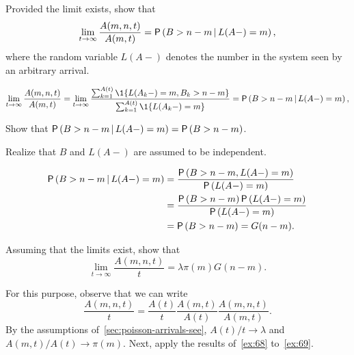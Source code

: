 \documentclass[companion]{subfiles}
\begin{document}
\begin{extra}
Provided the limit exists, show that
\begin{equation}\label{eq:1332}
\lim_{t\to\infty} \frac{A(m,n,t)}{A(m,t)} =\P{B>n-m\given L(A-)=m},
\end{equation}
where the random variable $L(A-)$ denotes the number in the system seen by an arbitrary arrival.
\begin{solution}
\begin{equation*}
\lim_{t\to\infty} \frac{A(m,n,t)}{A(m,t)} = 
\lim_{t\to\infty} \frac{\sum_{k=1}^{A(t)}\1{L(A_k-) = m, B_k > n-m}}
{\sum_{k=1}^{A(t)}\1{L(A_k-) = m}}=\P{B>n-m\given L(A-)=m},
\end{equation*}
\end{solution}
\end{extra}


\begin{extra}
Show that $\P{B>n-m\given L(A-)=m}=\P{B>n-m}$.
\begin{hint}
 Realize that $B$ and $L(A-)$ are assumed to be independent.
\end{hint}
\begin{solution}
\begin{equation*}
 \begin{split}
\P{B>n-m\given L(A-)=m} &=
\frac{\P{B>n-m,L(A-)=m}}{\P{L(A-)=m}}\\
&=\frac{\P{B>n-m}\P{L(A-)=m}}{\P{L(A-)=m}} \\
&= \P{B>n-m} =G(n-m).
 \end{split}
\end{equation*}
\end{solution}
\end{extra}

\begin{exercise}
Assuming that the limits exist, show that
\begin{equation*}
\lim_{t\to\infty} \frac{A(m,n,t)}t = \lambda \pi(m) G(n-m).
\end{equation*}
\begin{solution}
For this purpose, observe that we can write
\begin{equation}\label{eq:16}
 \frac{A(m,n,t)}t = \frac{A(t)}t \frac{A(m,t)}{A(t)}\frac{A(m,n,t)}{A(m,t)}.
\end{equation}
By the assumptions of~\cref{sec:poisson-arrivals-see}, $A(t)/t\to\lambda$ and $A(m,t)/A(t)\to\pi(m)$.
Next, apply the results of~\cref{ex:68} to~\cref{ex:69}.
\end{solution}
\end{exercise}
\end{document}
